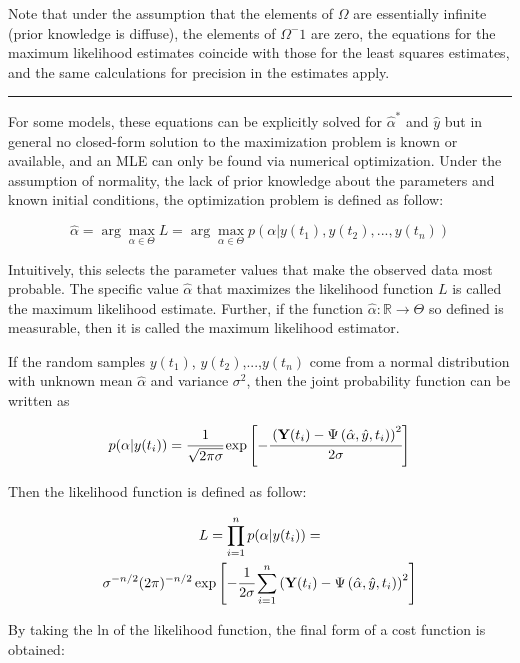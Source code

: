 \documentclass[a4paper,fleqn]{cas-dc}
\begin{document}
Note that under the assumption that the elements of $\Omega$ are essentially infinite (prior knowledge is diffuse), the elements of $\Omega^-1$ are zero, the equations for the maximum likelihood estimates coincide with those for the least squares estimates, and the same calculations for precision in the estimates apply.

\hrule

For some models, these equations can be explicitly solved for $\hat{\alpha}^*$ and $\hat{y}$ but in general no closed-form solution to the maximization problem is known or available, and an MLE can only be found via numerical optimization. Under the assumption of normality, the lack of prior knowledge about the parameters and known initial conditions, the optimization problem is defined as follow:

\begin{equation}
	\hat{\alpha} = \arg \max_{\alpha \in \Theta} L = \arg \max_{\alpha \in \Theta} p(\alpha|y(t_1),y(t_2),...,y(t_n))
\end{equation}

Intuitively, this selects the parameter values that make the observed data most probable. The specific value $\hat{\alpha}$ that maximizes the likelihood function $L$ is called the maximum likelihood estimate. Further, if the function $\hat{\alpha}:\mathbb{R}\rightarrow\Theta$ so defined is measurable, then it is called the maximum likelihood estimator.

If the random samples $y(t_1)$, $y(t_2)$,...,$y(t_n)$ come from a normal distribution with unknown mean $\hat{\alpha}$ and variance $\sigma^2$, then the joint probability function can be written as 

\begin{equation}
	p(\alpha|y(t_i)) = \cfrac{1}{\sqrt{2\pi\sigma}}\exp\left[-\cfrac{ \left( \textbf{Y}(t_i) - \Psi\left( \hat{\alpha}, \hat{y}, t_i \right) \right)^2}{2\sigma}\right]
\end{equation}

Then the likelihood function is defined as follow:

\begin{multline} 
	L =\prod\limits_{i=1}^n p(\alpha|y(t_i))= \\ \sigma^{-n/2}(2\pi)^{-n/2}\exp\left[-\cfrac{1}{2\sigma}\sum\limits_{i=1}^n \left( \textbf{Y}(t_i) - \Psi\left( \hat{\alpha}, \hat{y}, t_i \right) \right)^2\right]
\end{multline}

By taking the ln of the likelihood function, the final form of a cost function is obtained:
\end{document}
